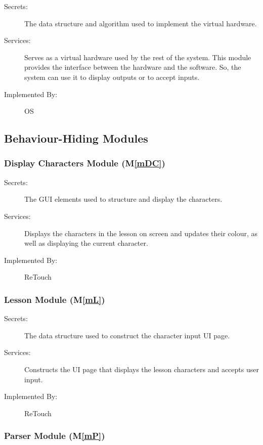 \documentclass[12pt, titlepage]{article}
\newcommand{\mref}[1]{M\ref{#1}}
\begin{document}
\begin{description}
\item[Secrets:]The data structure and algorithm used to implement the virtual
  hardware.
\item[Services:]Serves as a virtual hardware used by the rest of the
  system. This module provides the interface between the hardware and the
  software. So, the system can use it to display outputs or to accept inputs.
\item[Implemented By:] OS
\end{description}

\subsection{Behaviour-Hiding Modules}


\subsubsection{Display Characters Module (\mref{mDC})}

\begin{description}
\item[Secrets:]The GUI elements used to structure and display the characters.
\item[Services:]Displays the characters in the lesson on screen and updates their colour, as well as displaying the current character.
\item[Implemented By:] ReTouch
\end{description}


\subsubsection{Lesson Module (\mref{mL})}

\begin{description}
\item[Secrets:]The data structure used to construct the character input UI page.
\item[Services:]Constructs the UI page that displays the lesson characters and accepts user input.
\item[Implemented By:] ReTouch
\end{description}


\subsubsection{Parser Module (\mref{mP})}
\end{document}
